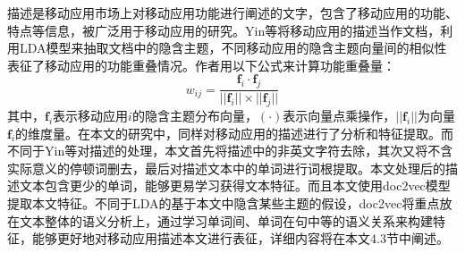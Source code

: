 描述是移动应用市场上对移动应用功能进行阐述的文字，包含了移动应用的功能、特点等信息，被广泛用于移动应用的研究。Yin等\cite{yin2013app}将移动应用的描述当作文档，利用LDA模型\cite{blei2003latent}来抽取文档中的隐含主题，不同移动应用的隐含主题向量间的相似性表征了移动应用的功能重叠情况。作者用以下公式来计算功能重叠量：
\begin{equation}
w_{ij} = \frac{\mathbf{f}_i \cdot \mathbf{f}_j}{||\mathbf{f}_i|| \times ||\mathbf{f}_j||}
\end{equation}
其中，$\mathbf{f}_i$表示移动应用$i$的隐含主题分布向量，$(\cdot)$表示向量点乘操作，$||\mathbf{f}_i||$为向量$\mathbf{f}_i$的维度量。在本文的研究中，同样对移动应用的描述进行了分析和特征提取。而不同于Yin等\cite{yin2013app}对描述的处理，本文首先将描述中的非英文字符去除，其次又将不含实际意义的停顿词删去，最后对描述文本中的单词进行词根提取。本文处理后的描述文本包含更少的单词，能够更易学习获得文本特征。而且本文使用doc2vec模型\cite{le2014distributed}提取本文特征。不同于LDA的基于本文中隐含某些主题的假设，doc2vec将重点放在文本整体的语义分析上，通过学习单词间、单词在句中等的语义关系来构建特征，能够更好地对移动应用描述本文进行表征，详细内容将在本文4.3节中阐述。

